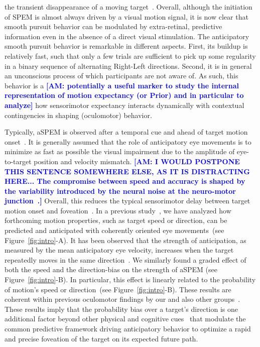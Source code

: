 \documentclass[12pt,english]{article}%
\newcommand{\citep}[1]{\parencite{#1}}
\newcommand{\seeFig}[1]{Figure~\ref{fig:#1}}
\newcommand{\AM}[1]{\textbf{\textcolor{blue}{[AM: #1]}}}
\begin{document}
the transient disappearance of a moving target~\citep{Badler2006,BeckerFuchs1985}.
Overall, although the initiation of SPEM is almost always driven by a visual motion signal, it is now clear that smooth pursuit behavior
can be modulated by extra-retinal, predictive information even in the absence of a direct visual stimulation.
The anticipatory smooth pursuit behavior is remarkable
in different aspects.
First, its buildup is relatively fast, such that only a few trials are sufficient
to pick up some regularity in a binary sequence of alternating Right-Left directions.
Second, it is in general an unconscious process
of which participants are not aware of.
As such, this behavior is a \AM{potentially a useful marker
to study the internal representation of motion expectancy (or Prior) and in particular to analyze} how sensorimotor expectancy interacts dynamically with contextual contingencies in shaping (oculomotor) behavior.

Typically, aSPEM is observed after a temporal cue and
ahead of target motion onset~\citep{Kowler1979a,Kowler1979b, Kowler1984}. %
It is generally assumed that the role of anticipatory eye movements is
to minimize as fast as possible the visual impairment due
to the amplitude of eye-to-target position and velocity mismatch.
\AM{I WOULD POSTPONE THIS SENTENCE SOMEWHERE ELSE, AS IT IS DISTRACTING HERE... The compromise between speed and accuracy is shaped
by the variability introduced by the neural noise
at the neuro-motor junction~\citep{Harris98}.}
Overall, this reduces the typical sensorimotor delay
between target motion onset and foveation~\citep{REFNEEDED}.
In a previous study~\citep{Montagnini2010},
we have analyzed how forthcoming motion properties,
such as target speed or direction, can be
predicted and anticipated with coherently oriented eye movements~(see \seeFig{intro}-A).
It has been observed that the strength of anticipation,
as measured by the mean anticipatory eye velocity,
increases when the target repeatedly moves in the same direction~\citep{Kowler1984, Kowler1989, Heinen2005}.
We similarly found a graded effect of both the speed and the direction-bias
on the strength of aSPEM (see \seeFig{intro}-B).
In particular, this effect is linearly related
to the probability of motion's speed or direction~(see \seeFig{intro}-B).
These results are coherent within previous oculomotor findings
by our and also other groups~\citep{SantosKowler2017}.
These results imply that the probability bias over a target's direction is
one additional factor beyond other physical and cognitive cues~\citep{Kowler2014, SantosKowler2017,Damasse18}
that modulate the common predictive framework
driving anticipatory behavior to optimize a rapid and
precise foveation of the target on its expected future path.
\end{document}
